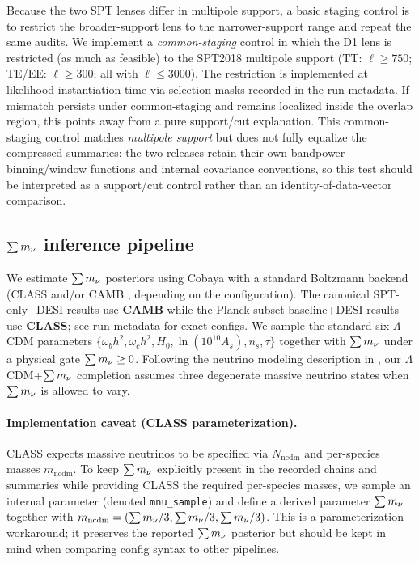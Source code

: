 Because the two SPT lenses differ in multipole support, a basic staging control is to restrict the broader-support lens to the narrower-support range and repeat the same audits. We implement a \emph{common-staging} control in which the D1 lens is restricted (as much as feasible) to the SPT2018 multipole support (TT: $\ell\ge 750$; TE/EE: $\ell\ge 300$; all with $\ell\le 3000$). The restriction is implemented at likelihood-instantiation time via selection masks recorded in the run metadata. If mismatch persists under common-staging and remains localized inside the overlap region, this points away from a pure support/cut explanation.
This common-staging control matches \emph{multipole support} but does not fully equalize the compressed summaries: the two releases retain their own bandpower binning/window functions and internal covariance conventions, so this test should be interpreted as a support/cut control rather than an identity-of-data-vector comparison.

\subsection{$\sum m_\nu$ inference pipeline}
\label{sec:mnu-inference}

We estimate $\sum m_\nu$ posteriors using Cobaya \cite{cobaya} with a standard Boltzmann backend (CLASS \cite{class} and/or CAMB \cite{camb}, depending on the configuration). The canonical SPT-only+DESI results use \textbf{CAMB} while the Planck-subset baseline+DESI results use \textbf{CLASS}; see run metadata for exact configs. We sample the standard six $\Lambda$CDM parameters $\{\omega_b h^2, \omega_c h^2, H_0, \ln(10^{10}A_s), n_s, \tau\}$ together with $\sum m_\nu$ under a physical gate $\sum m_\nu\ge 0$. Following the neutrino modeling description in \cite{arxiv2601_16277}, our $\Lambda$CDM+$\sum m_\nu$ completion assumes three degenerate massive neutrino states when $\sum m_\nu$ is allowed to vary.

\paragraph{Implementation caveat (CLASS parameterization).}
CLASS expects massive neutrinos to be specified via $N_{\mathrm{ncdm}}$ and per-species masses $m_{\mathrm{ncdm}}$. To keep $\sum m_\nu$ explicitly present in the recorded chains and summaries while providing CLASS the required per-species masses, we sample an internal parameter (denoted \texttt{mnu\_sample}) and define a derived parameter $\sum m_\nu$ together with $m_{\mathrm{ncdm}}=(\sum m_\nu/3,\sum m_\nu/3,\sum m_\nu/3)$. This is a parameterization workaround; it preserves the reported $\sum m_\nu$ posterior but should be kept in mind when comparing config syntax to other pipelines.

